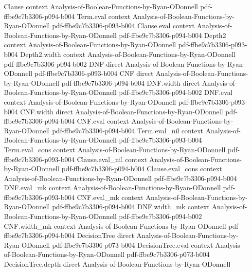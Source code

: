 \begin{lemma}
\proofstep
  {Clause}
  {context}
  {Analysis-of-Boolean-Functions-by-Ryan-ODonnell}
  {pdf-ffbe9c7b3306-p094-b004}
\proofstep
  {Term.eval}
  {context}
  {Analysis-of-Boolean-Functions-by-Ryan-ODonnell}
  {pdf-ffbe9c7b3306-p093-b004}
\proofstep
  {Clause.eval}
  {context}
  {Analysis-of-Boolean-Functions-by-Ryan-ODonnell}
  {pdf-ffbe9c7b3306-p094-b004}
\proofstep
  {Depth2}
  {context}
  {Analysis-of-Boolean-Functions-by-Ryan-ODonnell}
  {pdf-ffbe9c7b3306-p093-b004}
\proofstep
  {Depth2.width}
  {context}
  {Analysis-of-Boolean-Functions-by-Ryan-ODonnell}
  {pdf-ffbe9c7b3306-p094-b002}
\proofstep
  {DNF}
  {direct}
  {Analysis-of-Boolean-Functions-by-Ryan-ODonnell}
  {pdf-ffbe9c7b3306-p093-b004}
\proofstep
  {CNF}
  {direct}
  {Analysis-of-Boolean-Functions-by-Ryan-ODonnell}
  {pdf-ffbe9c7b3306-p094-b004}
\proofstep
  {DNF.width}
  {direct}
  {Analysis-of-Boolean-Functions-by-Ryan-ODonnell}
  {pdf-ffbe9c7b3306-p094-b002}
\proofstep
  {DNF.eval}
  {context}
  {Analysis-of-Boolean-Functions-by-Ryan-ODonnell}
  {pdf-ffbe9c7b3306-p093-b004}
\proofstep
  {CNF.width}
  {direct}
  {Analysis-of-Boolean-Functions-by-Ryan-ODonnell}
  {pdf-ffbe9c7b3306-p094-b004}
\proofstep
  {CNF.eval}
  {context}
  {Analysis-of-Boolean-Functions-by-Ryan-ODonnell}
  {pdf-ffbe9c7b3306-p094-b004}
\proofstep
  {Term.eval_nil}
  {context}
  {Analysis-of-Boolean-Functions-by-Ryan-ODonnell}
  {pdf-ffbe9c7b3306-p093-b004}
\proofstep
  {Term.eval_cons}
  {context}
  {Analysis-of-Boolean-Functions-by-Ryan-ODonnell}
  {pdf-ffbe9c7b3306-p093-b004}
\proofstep
  {Clause.eval_nil}
  {context}
  {Analysis-of-Boolean-Functions-by-Ryan-ODonnell}
  {pdf-ffbe9c7b3306-p094-b004}
\proofstep
  {Clause.eval_cons}
  {context}
  {Analysis-of-Boolean-Functions-by-Ryan-ODonnell}
  {pdf-ffbe9c7b3306-p094-b004}
\proofstep
  {DNF.eval_mk}
  {context}
  {Analysis-of-Boolean-Functions-by-Ryan-ODonnell}
  {pdf-ffbe9c7b3306-p093-b004}
\proofstep
  {CNF.eval_mk}
  {context}
  {Analysis-of-Boolean-Functions-by-Ryan-ODonnell}
  {pdf-ffbe9c7b3306-p094-b004}
\proofstep
  {DNF.width_mk}
  {context}
  {Analysis-of-Boolean-Functions-by-Ryan-ODonnell}
  {pdf-ffbe9c7b3306-p094-b002}
\proofstep
  {CNF.width_mk}
  {context}
  {Analysis-of-Boolean-Functions-by-Ryan-ODonnell}
  {pdf-ffbe9c7b3306-p094-b004}
\proofstep
  {DecisionTree}
  {direct}
  {Analysis-of-Boolean-Functions-by-Ryan-ODonnell}
  {pdf-ffbe9c7b3306-p073-b004}
\proofstep
  {DecisionTree.eval}
  {context}
  {Analysis-of-Boolean-Functions-by-Ryan-ODonnell}
  {pdf-ffbe9c7b3306-p073-b004}
\proofstep
  {DecisionTree.depth}
  {direct}
  {Analysis-of-Boolean-Functions-by-Ryan-ODonnell}

\end{lemma}
